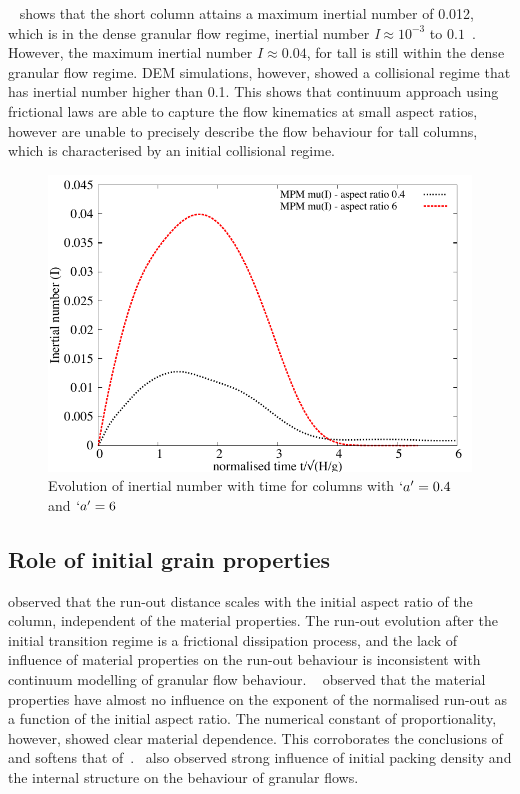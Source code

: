 ~ shows that the short column attains a maximum inertial 
number of 0.012, which is in the dense granular flow regime, inertial number 
\textit{I}$\approx10^{-3}$ to $0.1$~\citep{DaCruz2005}. However, the maximum 
inertial number $I\approx0.04$, for tall is still within the 
dense granular flow regime. DEM simulations, however, showed a collisional 
regime that has inertial number higher than 0.1. This shows that continuum 
approach using frictional laws are able to capture the flow kinematics at small 
aspect ratios, however are unable to precisely describe the flow behaviour for 
tall columns, which is characterised by an initial collisional regime.

\begin{figure}[tbhp]
\centering
\includegraphics[width=\textwidth]{muI}
\caption{Evolution of inertial number with time for columns with $`a'=0.4$ and 
$`a'=6$}
\label{fig:muI}
\end{figure}

\subsection{Role of initial grain properties}

\citet{Lube2005} observed that the run-out distance scales with the initial 
aspect ratio of the column, independent of the material properties. The 
run-out 
evolution after the initial transition regime is a frictional dissipation 
process, and the lack of influence of material properties on the run-out 
behaviour is inconsistent with continuum modelling of granular flow behaviour. 
~\citet{Balmforth2005} observed that the material properties have almost no 
influence on the exponent of the normalised run-out as a function of the 
initial aspect ratio. The numerical constant of proportionality, however, 
showed clear material dependence. This corroborates the conclusions 
of~\citet{Lajeunesse2004} and softens that 
of~\citet{Lube2005}.~\citet{Daerr1999} also observed strong influence of 
initial packing density and the internal structure on the behaviour of 
granular 
flows. 


